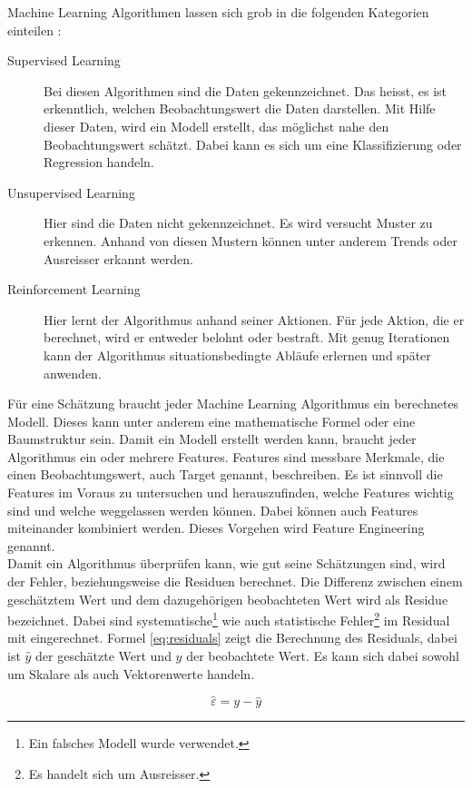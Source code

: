 \begin{samepage}
Machine Learning Algorithmen lassen sich grob in die folgenden Kategorien einteilen \cite{super_unsuper}:
\begin{description}
  \item[Supervised Learning]	Bei diesen Algorithmen sind die Daten gekennzeichnet. Das heisst, es ist erkenntlich, welchen Beobachtungswert die Daten darstellen. Mit Hilfe dieser Daten, wird ein Modell erstellt, das möglichst nahe den Beobachtungswert schätzt. Dabei kann es sich um eine Klassifizierung oder Regression handeln.
  \item[Unsupervised Learning] Hier sind die Daten nicht gekennzeichnet. Es wird versucht Muster zu erkennen. Anhand von diesen Mustern können unter anderem Trends oder Ausreisser erkannt werden.
  \item[Reinforcement Learning] Hier lernt der Algorithmus anhand seiner Aktionen. Für jede Aktion, die er berechnet, wird er entweder belohnt oder bestraft. Mit genug Iterationen kann der Algorithmus situationsbedingte Abläufe erlernen und später anwenden.
\end{description}
\end{samepage}

Für eine Schätzung braucht jeder Machine Learning Algorithmus ein berechnetes Modell. Dieses kann unter anderem eine mathematische Formel oder eine Baumstruktur sein. Damit ein Modell erstellt werden kann, braucht jeder Algorithmus ein oder mehrere Features. Features sind messbare Merkmale, die einen Beobachtungswert, auch Target genannt, beschreiben. Es ist sinnvoll die Features im Voraus zu untersuchen und herauszufinden, welche Features wichtig sind und welche weggelassen werden können. Dabei können auch Features miteinander kombiniert werden. Dieses Vorgehen wird Feature Engineering genannt.\\[2ex]
%
Damit ein Algorithmus überprüfen kann, wie gut seine Schätzungen sind, wird der Fehler, beziehungsweise die Residuen berechnet. Die Differenz zwischen einem geschätztem Wert und dem dazugehörigen beobachteten Wert wird als Residue bezeichnet. Dabei sind systematische\footnote{Ein falsches Modell wurde verwendet.} wie auch statistische Fehler\footnote{Es handelt sich um Ausreisser.} im Residual mit  eingerechnet. Formel \eqref{eq:residuals} zeigt die Berechnung des Residuals, dabei ist $\hat{y}$ der geschätzte Wert und $y$ der beobachtete Wert. Es kann sich dabei sowohl um Skalare als auch Vektorenwerte handeln.

\begin{equation}
\label{eq:residuals}
\hat{\varepsilon} = y - \hat{y}
\end{equation}

